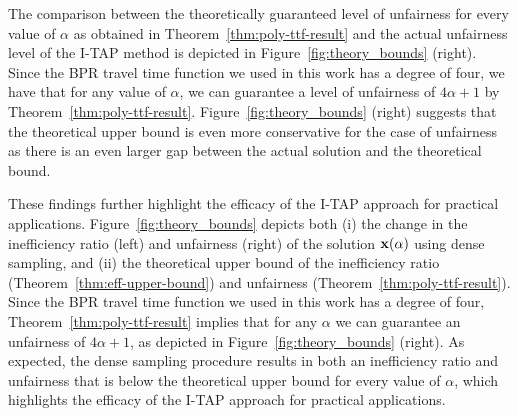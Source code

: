 \documentclass{article}
\begin{document}
The comparison between the theoretically guaranteed level of unfairness for every value of $\alpha$ as obtained in Theorem~\ref{thm:poly-ttf-result} and the actual unfairness level of the I-TAP method is depicted in Figure~\ref{fig:theory_bounds} (right). Since the BPR travel time function we used in this work has a degree of four, we have that for any value of $\alpha$, we can guarantee a level of unfairness of $4 \alpha + 1$ by Theorem~\ref{thm:poly-ttf-result}. %
Figure~\ref{fig:theory_bounds} (right) suggests that the theoretical upper bound is even more conservative for the case of unfairness as there is an even larger gap between the actual solution and the theoretical bound. %

These findings further highlight the efficacy of the I-TAP approach for practical applications. %
\else
Figure~\ref{fig:theory_bounds} depicts both (i) the change in the inefficiency ratio (left) and unfairness (right) of the solution $\mathbf{x}(\alpha)$ using dense sampling, and (ii) the theoretical upper bound of the inefficiency ratio (Theorem~\ref{thm:eff-upper-bound}) and unfairness (Theorem~\ref{thm:poly-ttf-result}). Since the BPR travel time function we used in this work has a degree of four, Theorem~\ref{thm:poly-ttf-result} implies that for any $\alpha$ we can guarantee an unfairness of $4 \alpha + 1$, as depicted in Figure~\ref{fig:theory_bounds} (right). As expected, the dense sampling procedure results in both an inefficiency ratio and unfairness that is below the theoretical upper bound for every value of $\alpha$, which highlights the efficacy of the I-TAP approach for practical applications.
\end{document}
